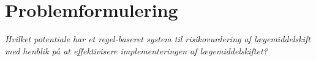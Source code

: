 \section{Problemformulering}



\textit{Hvilket potentiale har et regel-baseret system til risikovurdering af lægemiddelskift med henblik på at effektivisere implementeringen af lægemiddelskiftet?}

